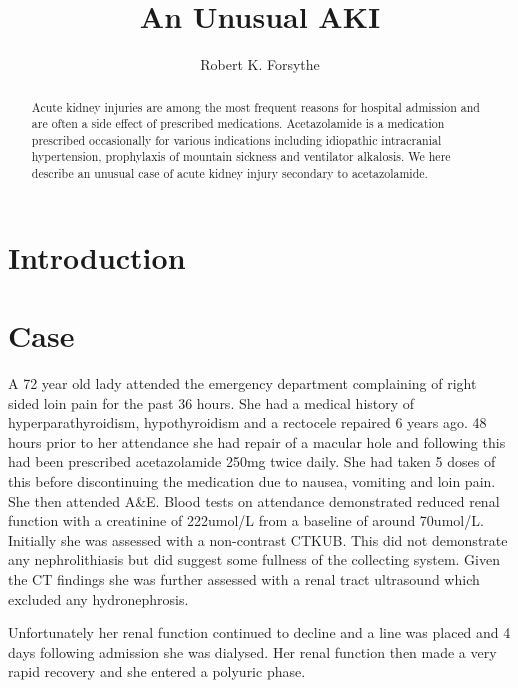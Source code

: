 \documentclass[11pt, ]{article}
\title{An Unusual AKI}
\author{Robert K. Forsythe}
\begin{document}
\maketitle
\begin{abstract}
	Acute kidney injuries are among the most frequent reasons for hospital admission and are often a side effect of prescribed medications. Acetazolamide is a medication prescribed occasionally for various indications including idiopathic intracranial hypertension, prophylaxis of mountain sickness and ventilator alkalosis. We here describe an unusual case of acute kidney injury secondary to acetazolamide. 
\end{abstract}

\section*{Introduction}

		
\section*{Case}

A 72 year old lady attended the emergency department complaining of right sided loin pain for the past 36 hours. She had a medical history of hyperparathyroidism, hypothyroidism and a rectocele repaired 6 years ago. 48 hours prior to her attendance she had repair of a macular hole and following this had been prescribed acetazolamide 250mg twice daily. She had taken 5 doses of this before discontinuing the medication due to nausea, vomiting and loin pain. She then attended A\&E. Blood tests on attendance demonstrated reduced renal function with a creatinine of 222umol/L from a baseline of around 70umol/L. Initially she was assessed with a non-contrast CTKUB. This did not demonstrate any nephrolithiasis but did suggest some fullness of the collecting system. Given the CT findings she was further assessed with a renal tract ultrasound which excluded any hydronephrosis. 

Unfortunately her renal function continued to decline and a line was placed and 4 days following admission she was dialysed. Her renal function then made a very rapid recovery and she entered a polyuric phase. 
\end{document}
